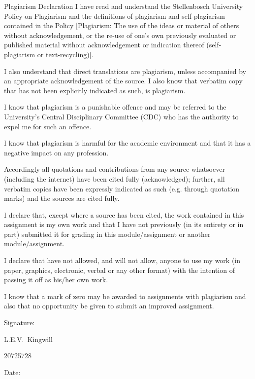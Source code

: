 \begin{Summary}{Plagiarism Declaration}
I have read and understand the Stellenbosch University Policy on Plagiarism and the definitions of plagiarism and self-plagiarism contained in the Policy [Plagiarism: The use of the ideas or material of others without acknowledgement, or the re-use of one's own previously evaluated or published material without acknowledgement or indication thereof (self-plagiarism or text-recycling)].\par
\vspace{0.4cm}
I also understand that direct translations are plagiarism, unless accompanied by an appropriate acknowledgement of the source. I also know that verbatim copy that has not been explicitly indicated as such, is plagiarism.\par
\vspace{0.4cm}
I know that plagiarism is a punishable offence and may be referred to the University's Central Disciplinary Committee (CDC) who has the authority to expel me for such an offence.\par
\vspace{0.4cm}
I know that plagiarism is harmful for the academic environment and that it has a negative impact on any profession.\par
\vspace{0.4cm}
Accordingly all quotations and contributions from any source whatsoever (including the internet) have been cited fully (acknowledged); further, all verbatim copies have been expressly indicated as such (e.g. through quotation marks) and the sources are cited fully.\par
\vspace{0.4cm}
I declare that, except where a source has been cited, the work contained in this assignment is my own work and that I have not previously (in its entirety or in part) submitted it for grading in this module/assignment or another module/assignment.\par
\vspace{0.4cm}
I declare that have not allowed, and will not allow, anyone to use my work (in paper, graphics, electronic, verbal or any other format) with the intention of passing it off as his/her own work. \par
\vspace{0.4cm}
I know that a mark of zero may be awarded to assignments with plagiarism and also that no opportunity be given to submit an improved assignment.\par
\vspace{2cm} 


\noindent%
\parbox{.5\textwidth}{%
  Signature:\quad\dotfill\par
  \hfill L.E.V.\ Kingwill \hspace{1.2cm}\null\par
	\hfill 20725728 \hspace{1.2cm}\null}


\vspace{1cm}
\noindent%
\parbox{.5\textwidth}{%
  Date:\quad\dotfill\par}
\end{Summary}
